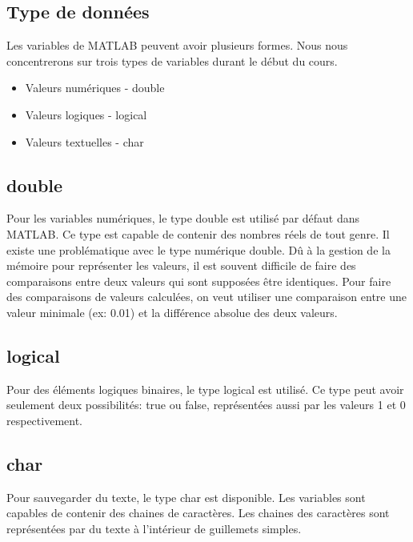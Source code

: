 \documentclass{tufte-handout}
\begin{document}
\subsection{Type de données}
Les variables de MATLAB peuvent avoir plusieurs formes. Nous nous concentrerons sur trois types de variables durant le début du cours.
\begin{itemize}
    \item Valeurs numériques - double
    \item Valeurs logiques - logical
    \item Valeurs textuelles - char 
\end{itemize}
\subsection{double}
Pour les variables numériques, le type double est utilisé par défaut dans MATLAB. Ce type est capable de contenir des nombres réels de tout genre.
Il existe une problématique avec le type numérique double. Dû à la gestion de la mémoire pour représenter les valeurs, il est souvent difficile de faire des comparaisons entre deux valeurs qui sont supposées être identiques. Pour faire des comparaisons de valeurs calculées, on veut utiliser une comparaison entre une valeur minimale (ex: 0.01) et la différence absolue des deux valeurs.
\subsection{logical}
Pour des éléments logiques binaires, le type logical est utilisé. Ce type peut avoir seulement deux possibilités: true ou false, représentées aussi par les valeurs 1 et 0 respectivement.
\subsection{char}
Pour sauvegarder du texte, le type char est disponible. Les variables sont capables de contenir des chaines de caractères.
Les chaines des caractères sont représentées par du texte à l'intérieur de guillemets simples.
\end{document}
